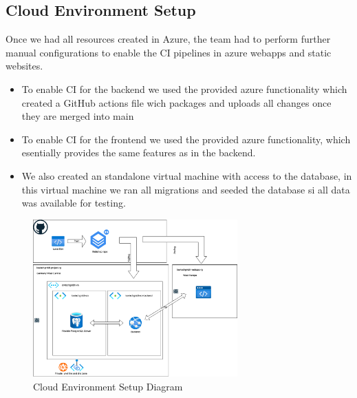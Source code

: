\documentclass{llncs}
\begin{document}
\subsection{Cloud Environment Setup}


Once we had all resources created in Azure, the team had to perform further manual configurations to enable the CI pipelines in azure webapps and static websites.
\begin{itemize}
    \item To enable CI for the backend we used the provided azure functionality which created a GitHub actions file wich packages and uploads all changes once they are merged into main
    \item To enable CI for the frontend we used the provided azure functionality, which esentially provides the same features as in the backend.
    \item We also created an standalone virtual machine with access to the database, in this virtual machine we ran all migrations and seeded the database si all data was available for testing.\\
\end{itemize}

\begin{figure}[H]
    \begin{center}
        \includegraphics[width=0.7\textwidth]{../diagrams/webapp_tf_azure.drawio.png}
        \vspace{0.01\textwidth}
        \caption{Cloud Environment Setup Diagram}
        \label{CloudSetup} %
    \end{center}
\end{figure}
\end{document}
